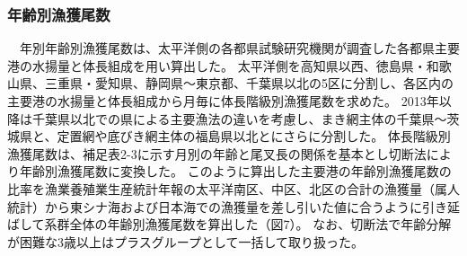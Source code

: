\subsubsection{年齢別漁獲尾数}
　年別年齢別漁獲尾数は、太平洋側の各都県試験研究機関が調査した各都県主要港の水揚量と体長組成を用い算出した。
太平洋側を高知県以西、徳島県・和歌山県、三重県・愛知県、静岡県～東京都、千葉県以北の5区に分割し、各区内の主要港の水揚量と体長組成から月毎に体長階級別漁獲尾数を求めた。
2013年以降は千葉県以北での県による主要漁法の違いを考慮し、まき網主体の千葉県～茨城県と、定置網や底びき網主体の福島県以北とにさらに分割した。
体長階級別漁獲尾数は、補足表2-3に示す月別の年齢と尾叉長の関係を基本とし切断法により年齢別漁獲尾数に変換した。
このように算出した主要港の年齢別漁獲尾数の比率を漁業養殖業生産統計年報の太平洋南区、中区、北区の合計の漁獲量（属人統計）から東シナ海および日本海での漁獲量を差し引いた値に合うように引き延ばして系群全体の年齢別漁獲尾数を算出した（図7）。
なお、切断法で年齢分解が困難な3歳以上はプラスグループとして一括して取り扱った。

